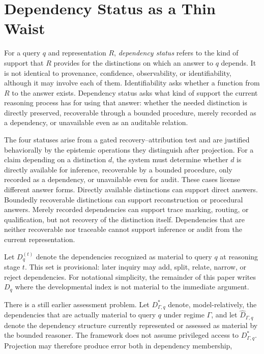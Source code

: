 \documentclass[11pt]{article}
\theoremstyle{definition}
\theoremstyle{remark}
\begin{document}
\section{Dependency Status as a Thin Waist}
\label{sec:dependency-thin-waist}

For a query $q$ and representation $R$, \emph{dependency status} refers to the kind of support that $R$ provides for the distinctions on which an answer to $q$ depends. It is not identical to provenance, confidence, observability, or identifiability, although it may involve each of them. Identifiability asks whether a function from $R$ to the answer exists. Dependency status asks what kind of support the current reasoning process has for using that answer: whether the needed distinction is directly preserved, recoverable through a bounded procedure, merely recorded as a dependency, or unavailable even as an auditable relation.

The four statuses arise from a gated recovery--attribution test and are justified behaviorally by the epistemic operations they distinguish after projection. For a claim depending on a distinction $d$, the system must determine whether $d$ is directly available for inference, recoverable by a bounded procedure, only recorded as a dependency, or unavailable even for audit. These cases license different answer forms. Directly available distinctions can support direct answers. Boundedly recoverable distinctions can support reconstruction or procedural answers. Merely recorded dependencies can support trace marking, routing, or qualification, but not recovery of the distinction itself. Dependencies that are neither recoverable nor traceable cannot support inference or audit from the current representation.

Let \(D_q^{(t)}\) denote the dependencies recognized as material to query \(q\) at reasoning stage \(t\). This set is provisional: later inquiry may add, split, relate, narrow, or reject dependencies. For notational simplicity, the remainder of this paper writes \(D_q\) where the developmental index is not material to the immediate argument.

There is a still earlier assessment problem. Let \(D^*_{\Gamma,q}\) denote, model-relatively, the dependencies that are actually material to query \(q\) under regime \(\Gamma\), and let \(\widehat D_{\Gamma,q}\) denote the dependency structure currently represented or assessed as material by the bounded reasoner. The framework does not assume privileged access to \(D^*_{\Gamma,q}\). Projection may therefore produce error both in dependency membership,
\end{document}
